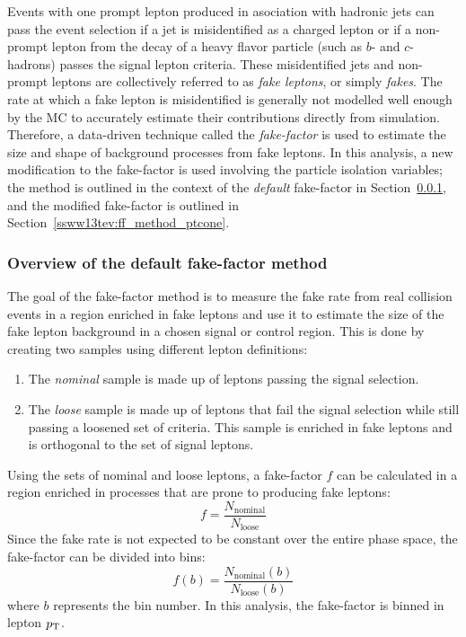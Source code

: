 Events with one prompt lepton produced in asociation with hadronic jets can pass the event selection if a jet is misidentified as a charged lepton or if a non-prompt lepton from the decay of a heavy flavor particle (such as $b$- and $c$-hadrons) passes the signal lepton criteria.
These misidentified jets and non-prompt leptons are collectively referred to as \emph{fake leptons}, or simply \emph{fakes}.
The rate at which a fake lepton is misidentified is generally not modelled well enough by the MC to accurately estimate their contributions directly from simulation.
Therefore, a data-driven technique called the \emph{fake-factor} is used to estimate the size and shape of background processes from fake leptons.
In this analysis, a new modification to the fake-factor is used involving the particle isolation variables; the method is outlined in the context of the \emph{default} fake-factor in Section~\ref{ssww13tev:ff_method_default}, and the modified fake-factor is outlined in Section~\ref{ssww13tev:ff_method_ptcone}.

%
\subsubsection{Overview of the default fake-factor method}\label{ssww13tev:ff_method_default}
The goal of the fake-factor method is to measure the fake rate from real collision events in a region enriched in fake leptons and use it to estimate the size of the fake lepton background in a chosen signal or control region.
This is done by creating two samples using different lepton definitions: 
\begin{enumerate}
\item The \emph{nominal} sample is made up of leptons passing the signal selection.
\item The \emph{loose} sample is made up of leptons that fail the signal selection while still passing a loosened set of criteria.  This sample is enriched in fake leptons and is orthogonal to the set of signal leptons.
\end{enumerate}
Using the sets of nominal and loose leptons, a fake-factor $f$ can be calculated in a region enriched in processes that are prone to producing fake leptons:
\begin{equation}
f = \frac{N_{\textrm{nominal}}}{N_{\textrm{loose}}}
\label{eq:ssww13tev_ff_default_unbinned}
\end{equation}
Since the fake rate is not expected to be constant over the entire phase space, the fake-factor can be divided into bins:
\begin{equation}
f(b) = \frac{N_{\textrm{nominal}}(b)}{N_{\textrm{loose}}(b)}
\label{eq:ssww13tev_ff_default_binned}
\end{equation}
where $b$ represents the bin number.
In this analysis, the fake-factor is binned in lepton $p_{\mathrm{T}}$.

